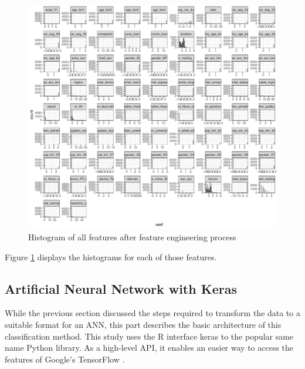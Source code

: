 \documentclass[12pt,a4paper]{article}
\newcommand{\pkg}[1]{{\normalfont\fontseries{b}\selectfont #1}}
\let\proglang=\textsf
\begin{document}
\begin{figure}[ht]
	\centering
  \includegraphics[scale=0.63]{figures/hist_all_features.pdf}
	\caption{Histogram of all features after feature engineering process}
	\label{fig_hist}
\end{figure}Figure \ref{fig_hist} displays the histograms for each
of those features.

\subsection{Artificial Neural Network with Keras}

While the previous section discussed the steps required to transform the data to a suitable format for an ANN,
this part describes the basic architecture of this classification method.
This study uses the \proglang{R} interface \pkg{keras} \citep{cholletInterfaceKeras2017} to the popular same name \proglang{Python} library.
As a high-level API, it enables an easier way to access the features of Google's \pkg{TensorFlow} \citep{abadiTensorFlowLargeScaleMachine2015}.
\end{document}
